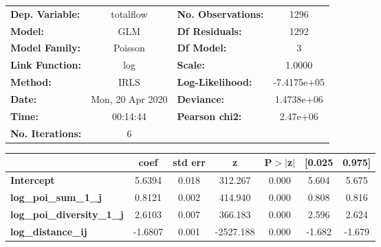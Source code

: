 \begin{center}
\begin{tabular}{lclc}
\toprule
\textbf{Dep. Variable:}            &    totalflow     & \textbf{  No. Observations:  } &      1296    \\
\textbf{Model:}                    &       GLM        & \textbf{  Df Residuals:      } &      1292    \\
\textbf{Model Family:}             &     Poisson      & \textbf{  Df Model:          } &         3    \\
\textbf{Link Function:}            &       log        & \textbf{  Scale:             } &     1.0000   \\
\textbf{Method:}                   &       IRLS       & \textbf{  Log-Likelihood:    } & -7.4175e+05  \\
\textbf{Date:}                     & Mon, 20 Apr 2020 & \textbf{  Deviance:          } &  1.4738e+06  \\
\textbf{Time:}                     &     00:14:44     & \textbf{  Pearson chi2:      } &   2.47e+06   \\
\textbf{No. Iterations:}           &        6         & \textbf{                     } &              \\
\bottomrule
\end{tabular}
\begin{tabular}{lcccccc}
                                   & \textbf{coef} & \textbf{std err} & \textbf{z} & \textbf{P$> |$z$|$} & \textbf{[0.025} & \textbf{0.975]}  \\
\midrule
\textbf{Intercept}                 &       5.6394  &        0.018     &   312.267  &         0.000        &        5.604    &        5.675     \\
\textbf{log\_poi\_sum\_1\_j}       &       0.8121  &        0.002     &   414.940  &         0.000        &        0.808    &        0.816     \\
\textbf{log\_poi\_diversity\_1\_j} &       2.6103  &        0.007     &   366.183  &         0.000        &        2.596    &        2.624     \\
\textbf{log\_distance\_ij}         &      -1.6807  &        0.001     & -2527.188  &         0.000        &       -1.682    &       -1.679     \\
\bottomrule
\end{tabular}
\end{center}